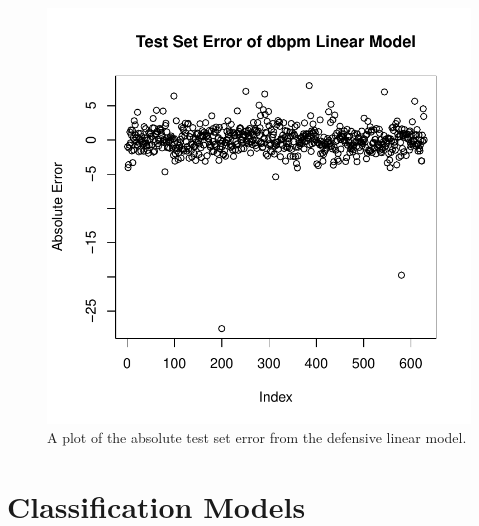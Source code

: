 \documentclass[12pt]{article}
\begin{document}
\begin{figure}[tbp]
	\centering
	\includegraphics[width=\textwidth]{dlm.test.error}
	\caption{A plot of the absolute test set error from the defensive linear model.}
	\label{fig:dlm.test.errort}
\end{figure}

\begin{table}[]
\centering
{}
\caption{Defensive Linear Model Evaluators}
\label{tab:olm_results}
\end{table}

\section{Classification Models}
\label{sec:cms}
\end{document}
